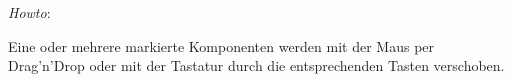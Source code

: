 \emph{Howto}:

Eine oder mehrere markierte Komponenten werden mit der Maus per Drag'n'Drop
oder mit der Tastatur durch die entsprechenden Tasten verschoben.

